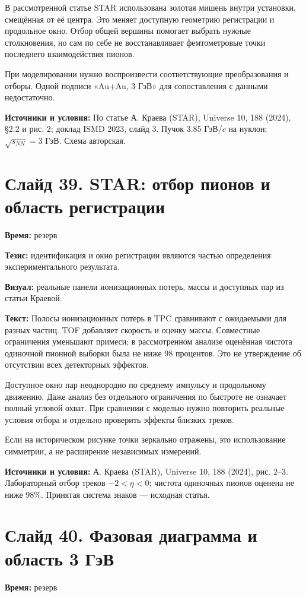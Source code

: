 \documentclass[11pt,a4paper]{article}
\begin{document}
В рассмотренной статье STAR использована золотая мишень внутри установки, смещённая от её центра. Это меняет доступную геометрию регистрации и продольное окно. Отбор общей вершины помогает выбрать нужные столкновения, но сам по себе не восстанавливает фемтометровые точки последнего взаимодействия пионов.

При моделировании нужно воспроизвести соответствующие преобразования и отборы. Одной подписи «Au+Au, 3 ГэВ» для сопоставления с данными недостаточно.

\textbf{Источники и условия:} По статье А. Краева (STAR), Universe 10, 188 (2024), §2.2 и рис. 2; доклад ISMD 2023, слайд 3. Пучок 3.85 ГэВ/\(c\) на нуклон; \(\sqrt{s_{NN}}=3\) ГэВ. Схема авторская.

\clearpage
\section*{Слайд 39. STAR: отбор пионов и область регистрации}
\textbf{Время:} резерв

\textbf{Тезис:} идентификация и окно регистрации являются частью определения экспериментального результата.

\textbf{Визуал:} реальные панели ионизационных потерь, массы и доступных пар из статьи Краевой.

\textbf{Текст:} Полосы ионизационных потерь в TPC сравнивают с ожидаемыми для разных частиц. TOF добавляет скорость и оценку массы. Совместные ограничения уменьшают примеси; в рассмотренном анализе оценённая чистота одиночной пионной выборки была не ниже 98 процентов. Это не утверждение об отсутствии всех детекторных эффектов.

Доступное окно пар неоднородно по среднему импульсу и продольному движению. Даже анализ без отдельного ограничения по быстроте не означает полный угловой охват. При сравнении с моделью нужно повторить реальные условия отбора и отдельно проверить эффекты близких треков.

Если на историческом рисунке точки зеркально отражены, это использование симметрии, а не расширение независимых измерений.

\textbf{Источники и условия:} А. Краева (STAR), Universe 10, 188 (2024), рис. 2–3. Лабораторный отбор треков \(-2<\eta<0\); чистота одиночных пионов оценена не ниже 98\%. Принятая система знаков — исходная статья.

\clearpage
\section*{Слайд 40. Фазовая диаграмма и область 3 ГэВ}
\textbf{Время:} резерв
\end{document}
